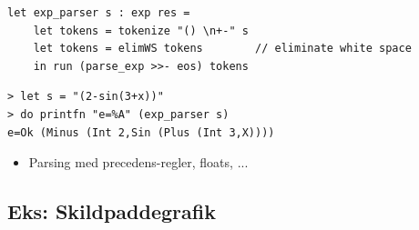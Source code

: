 \documentclass[rgb]{beamer}
\begin{document}
\begin{frame}[fragile]
\begin{footnotesize}


\begin{lstlisting}[numbers=none,frame=none,mathescape]
  let exp_parser s : exp res =
    let tokens = tokenize "() \n+-" s
    let tokens = elimWS tokens        // eliminate white space
    in run (parse_exp >>- eos) tokens
\end{lstlisting}


\begin{lstlisting}[numbers=none,frame=none,mathescape]
> let s = "(2-sin(3+x))"
> do printfn "e=%A" (exp_parser s)
e=Ok (Minus (Int 2,Sin (Plus (Int 3,X))))
\end{lstlisting}


\begin{itemize}
\item Parsing med precedens-regler, floats, ...
\end{itemize}
\end{footnotesize}
\end{frame}

\subsection{Eks: Skildpaddegrafik}
\end{document}
